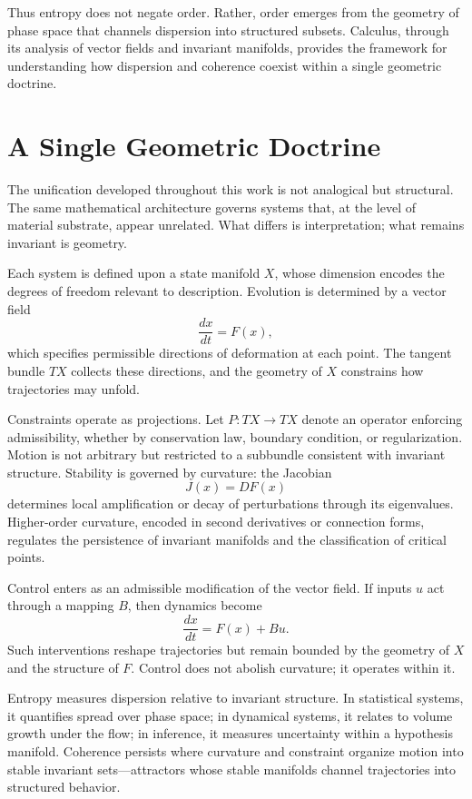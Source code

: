 \documentclass[12pt]{book}
\begin{document}
Thus entropy does not negate order. Rather, order emerges from the geometry of phase space that channels dispersion into structured subsets. Calculus, through its analysis of vector fields and invariant manifolds, provides the framework for understanding how dispersion and coherence coexist within a single geometric doctrine.

\section{A Single Geometric Doctrine}

The unification developed throughout this work is not analogical but structural. The same mathematical architecture governs systems that, at the level of material substrate, appear unrelated. What differs is interpretation; what remains invariant is geometry.

Each system is defined upon a state manifold $X$, whose dimension encodes the degrees of freedom relevant to description. Evolution is determined by a vector field
\[
\frac{dx}{dt} = F(x),
\]
which specifies permissible directions of deformation at each point. The tangent bundle $TX$ collects these directions, and the geometry of $X$ constrains how trajectories may unfold.

Constraints operate as projections. Let $P : TX \to TX$ denote an operator enforcing admissibility, whether by conservation law, boundary condition, or regularization. Motion is not arbitrary but restricted to a subbundle consistent with invariant structure. Stability is governed by curvature: the Jacobian
\[
J(x) = DF(x)
\]
determines local amplification or decay of perturbations through its eigenvalues. Higher-order curvature, encoded in second derivatives or connection forms, regulates the persistence of invariant manifolds and the classification of critical points.

Control enters as an admissible modification of the vector field. If inputs $u$ act through a mapping $B$, then dynamics become
\[
\frac{dx}{dt} = F(x) + Bu.
\]
Such interventions reshape trajectories but remain bounded by the geometry of $X$ and the structure of $F$. Control does not abolish curvature; it operates within it.

Entropy measures dispersion relative to invariant structure. In statistical systems, it quantifies spread over phase space; in dynamical systems, it relates to volume growth under the flow; in inference, it measures uncertainty within a hypothesis manifold. Coherence persists where curvature and constraint organize motion into stable invariant sets---attractors whose stable manifolds channel trajectories into structured behavior.
\end{document}
